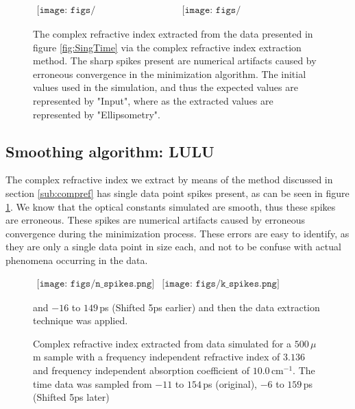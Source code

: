 \begin{figure}[H]
                \begin{center}$
								\begin{array}{cc}
                \texttt{[image: figs/Single\_n\_2\_d\_No\_LULU.png]}&
                \texttt{[image: figs/Single\_k\_2\_d\_No\_LULU.png]}
								\end{array}$
								\end{center}
	\caption[Extracted complex refractive index for single layer isotropic example]{The complex refractive index extracted from the data presented in figure \ref{fig:SingTime} via the complex refractive index extraction method. The sharp spikes present are numerical artifacts caused by erroneous convergence in the minimization algorithm. The initial values used in the simulation, and thus the expected values are represented by "Input", where as the extracted values are represented by "Ellipsometry".}
	\label{fig:SingExt_try1}
\end{figure}

\subsection{Smoothing algorithm: LULU}
\label{sub: LULU}
The complex refractive index we extract by means of the method discussed in section \ref{sub:compref} has single data point spikes present, as can be seen in figure \ref{fig:SingExt_try1}. We know that the optical constants simulated are smooth, thus these spikes are erroneous. These spikes are numerical artifacts caused by erroneous convergence during the minimization process. These errors are easy to identify, as they are only a single data point in size each, and not to be confuse with actual phenomena occurring in the data.

\begin{figure}[H]
                \begin{center}$
								\begin{array}{cc}
                \texttt{[image: figs/n\_spikes.png]}&
                \texttt{[image: figs/k\_spikes.png]}
								\end{array}$
								\end{center}
	\caption[Comparison of numerical spikes when sampling shifted]{Complex refractive index extracted from data simulated for a $500\,\mu$m sample with a frequency independent refractive index of $3.136$ and frequency independent absorption coefficient of $10.0\,\text{cm}^{-1}$. The time data was sampled from $-11$ to $154\,$ps (original), $-6$ to $159\,$ps (Shifted 5ps later)} and $-16$ to $149\,$ps (Shifted 5ps earlier) and then the data extraction technique was applied.
	\label{fig:spikes_shift}
\end{figure}


